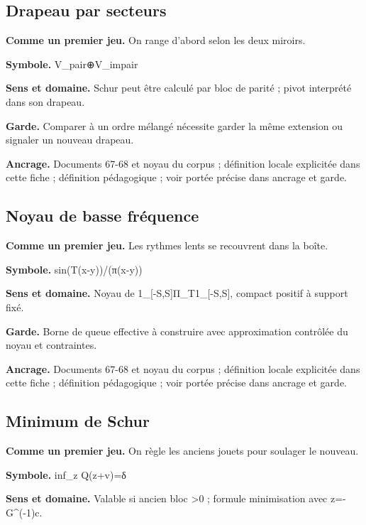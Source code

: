 \documentclass[
  9pt,
  a4paper,
]{article}
\begin{document}
\hypertarget{drapeau-par-secteurs}{%
\subsection{Drapeau par secteurs}\label{drapeau-par-secteurs}}

\textbf{Comme un premier jeu.} On range d'abord selon les deux miroirs.

\textbf{Symbole.} V\_pair⊕V\_impair

\textbf{Sens et domaine.} Schur peut être calculé par bloc de parité ;
pivot interprété dans son drapeau.

\textbf{Garde.} Comparer à un ordre mélangé nécessite garder la même
extension ou signaler un nouveau drapeau.

\textbf{Ancrage.} Documents 67-68 et noyau du corpus ; définition locale
explicitée dans cette fiche ; définition pédagogique ; voir portée
précise dans ancrage et garde.

\hypertarget{noyau-de-basse-fruxe9quence}{%
\subsection{Noyau de basse
fréquence}\label{noyau-de-basse-fruxe9quence}}

\textbf{Comme un premier jeu.} Les rythmes lents se recouvrent dans la
boîte.

\textbf{Symbole.} sin(T(x-y))/(π(x-y))

\textbf{Sens et domaine.} Noyau de 1\_{[}-S,S{]}Π\_T1\_{[}-S,S{]},
compact positif à support fixé.

\textbf{Garde.} Borne de queue effective à construire avec approximation
contrôlée du noyau et contraintes.

\textbf{Ancrage.} Documents 67-68 et noyau du corpus ; définition locale
explicitée dans cette fiche ; définition pédagogique ; voir portée
précise dans ancrage et garde.

\hypertarget{minimum-de-schur}{%
\subsection{Minimum de Schur}\label{minimum-de-schur}}

\textbf{Comme un premier jeu.} On règle les anciens jouets pour soulager
le nouveau.

\textbf{Symbole.} inf\_z Q(z+v)=δ

\textbf{Sens et domaine.} Valable si ancien bloc \textgreater0 ; formule
minimisation avec z=-G\^{}(-1)c.
\end{document}

